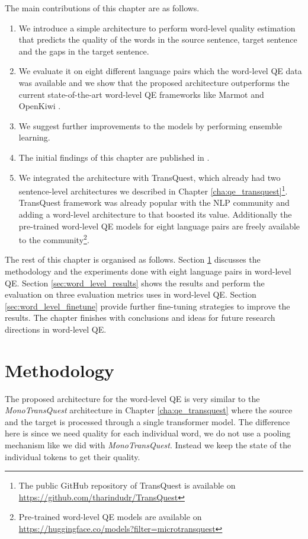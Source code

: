 The main contributions of this chapter are as follows.
\begin{enumerate}
  \item We introduce a simple architecture to perform word-level quality estimation that predicts the quality of the words in the source sentence, target sentence and the gaps in the target sentence.
  
  \item We evaluate it on eight different language pairs which the word-level QE data was available and we show that the proposed architecture outperforms the current state-of-the-art word-level QE frameworks like Marmot \autocite{logacheva-etal-2016-marmot} and OpenKiwi \autocite{kepler-etal-2019-openkiwi}.
  
  \item We suggest further improvements to the models by performing ensemble learning.
  
  \item The initial findings of this chapter are published in \autocite{ranasinghe-etal-2021-exploratory}. 
  
  \item We integrated the architecture with TransQuest, which already had two sentence-level architectures we described in Chapter \ref{cha:qe_transquest}\footnote{The public GitHub repository of TransQuest is available on \url{https://github.com/tharindudr/TransQuest}}. TransQuest framework was already popular with the NLP community and adding a word-level architecture to that boosted its value. Additionally the pre-trained word-level QE models for eight language pairs are freely available to the community\footnote{Pre-trained word-level QE models are available on \url{https://huggingface.co/models?filter=microtransquest}}. 
  	
\end{enumerate}

The rest of this chapter is organised as follows. Section \ref{sec:word_level_method} discusses the methodology and the experiments done with eight language pairs in word-level QE.  Section \ref{sec:word_level_results} shows the results and perform the evaluation on three evaluation metrics uses in word-level QE. Section \ref{sec:word_level_finetune} provide further fine-tuning strategies to improve the results. The chapter finishes with conclusions and ideas for future research directions in word-level QE.

\section{Methodology}
\label{sec:word_level_method}
The proposed architecture for the word-level QE is very similar to the \textit{MonoTransQuest} architecture in Chapter \ref{cha:qe_transquest} where the source and the target is processed through a single transformer model. The difference here is since we need quality for each individual word, we do not use a pooling mechanism like we did with \textit{MonoTransQuest}. Instead we keep the state of the individual tokens to get their quality.

